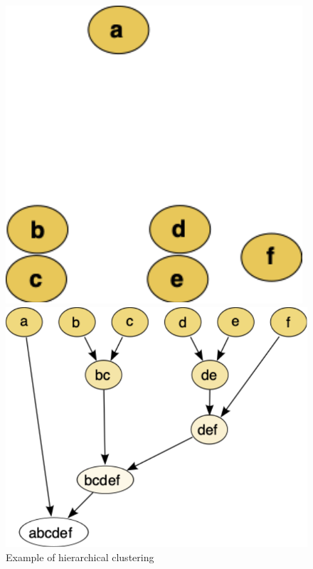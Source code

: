 \begin{figure}[htb!]
	\centering
	\begin{minipage}{0.35\textwidth}
		\includegraphics[width=0.8\linewidth]{pictures/topic/clusters.pdf}
	\end{minipage}
\hspace{3mm}
	\begin{minipage}{0.35\textwidth}
			\includegraphics[width=0.9\linewidth]{pictures/topic/hierarchical_clustering_simple_diagram.pdf}
	\end{minipage}
\caption{Example of hierarchical clustering}
\label{fig:topic/hc}
\end{figure}

